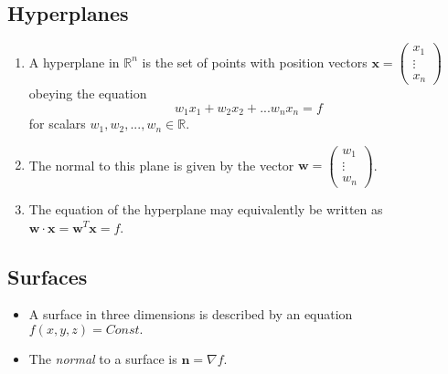 \documentclass[11pt]{article}
\renewcommand*{\vec}[1]{\mathbf{#1}}
\begin{document}
\subsection{Hyperplanes}
\begin{enumerate}
\item A hyperplane in $\mathbb{R}^n$ is the set of points with position vectors $\vec{x} = \begin{pmatrix} x_1\\ \vdots\\x_n\end{pmatrix}$ obeying the equation
$$\boxed{w_1x_1+w_2x_2 + ... w_nx_n = f}$$
for scalars $w_1,w_2, ..., w_n\in \mathbb{R}$.
\item  The normal to this plane is given by the vector $\vec{w} = \begin{pmatrix} w_1\\ \vdots \\ w_n\end{pmatrix}$.
\item The equation of the hyperplane may equivalently be written as $\vec{w}\cdot\vec{x} = \vec{w}^T\vec{x} = f$.
\end{enumerate}
\subsection{Surfaces}
\begin{itemize}
\item A surface in three dimensions is described by an equation $f(x,y,z)=Const.$
\item The \emph{normal} to a surface is $\boxed{\vec{n} = \nabla f}$.
\end{itemize}
\end{document}
